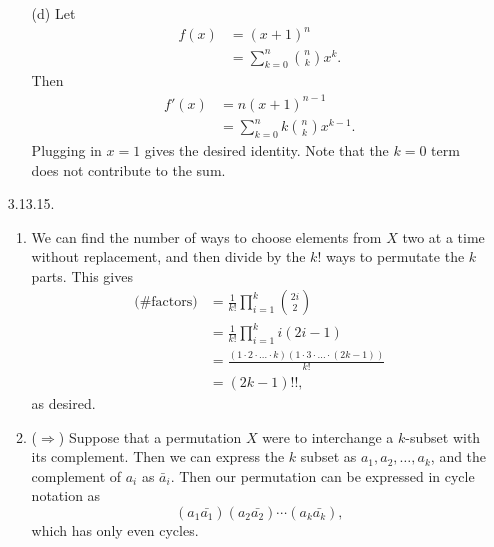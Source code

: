 \documentclass[11pt,letterpaper]{article}
\begin{document}
\begin{enumerate}
\begin{enumerate}
    \item[(d)] Let
    \begin{align*}
        f(x) &= (x+1)^n \\
        &= \sum_{k=0}^n \binom{n}{k}x^k.
    \end{align*}
    Then
    \begin{align*}
        f'(x) &= n(x+1)^{n-1} \\
        &= \sum_{k=0}^n k\binom{n}{k}x^{k-1}.
    \end{align*}
    Plugging in $x=1$ gives the desired identity. Note that the $k=0$ term does not contribute to the sum.
\end{enumerate}
    \item[3.13.15.]
    \begin{enumerate}
        \item We can find the number of ways to choose elements from $X$ two at a time without replacement, and then divide by the $k!$ ways to permutate the $k$ parts. This gives
        \begin{align*}
            \text{(\# factors)} &= \frac{1}{k!}\prod_{i=1}^k \binom{2i}{2} \\
            &= \frac{1}{k!}\prod_{i=1}^k i(2i-1) \\
            &= \frac{(1\cdot 2\cdot \dots \cdot k)(1\cdot 3\cdot \dots \cdot (2k-1))}{k!} \\
            &= (2k-1)!!,
        \end{align*}
        as desired.
        \item ($\Rightarrow$) Suppose that a permutation $X$ were to interchange a $k$-subset with its complement. Then we can express the $k$ subset as $a_1,a_2,\dots,a_k$, and the complement of $a_i$ as $\bar{a}_i$. Then our permutation can be expressed in cycle notation as 
        \[
            (a_1 \bar{a_1})(a_2 \bar{a_2})\cdots (a_k \bar{a_k}),
        \]
        which has only even cycles.


\end{enumerate}
\end{enumerate}
\end{document}

